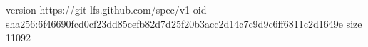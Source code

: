 version https://git-lfs.github.com/spec/v1
oid sha256:6f46690fcd0cf23dd85cefb82d7d25f20b3acc2d14c7c9d9c6ff6811c2d1649e
size 11092
